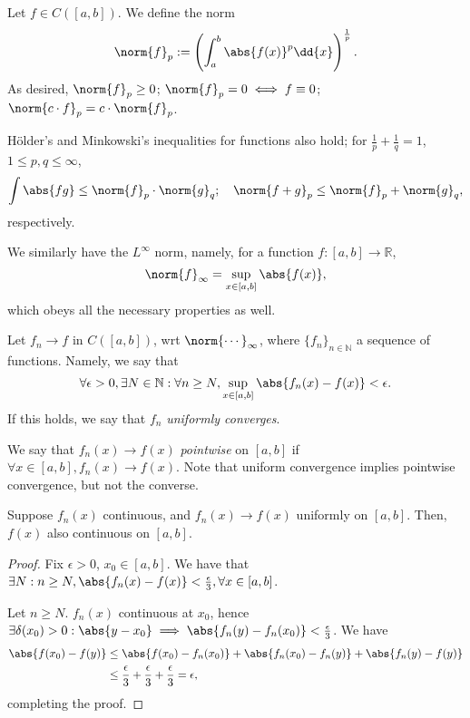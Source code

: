 \begin{example}
    Let $f \in C([a, b])$. We define the norm \[
    \norm{f}_p := \left(\int_a^b \abs{f(x)}^p \dd{x}\right)^\frac{1}{p}.
    \]
    As desired, $\norm{f}_p \geq 0$; $\norm{f}_p = 0 \iff f \equiv 0$; $\norm{c \cdot f}_p  = c \cdot \norm{f}_p$.

    Hölder's and Minkowski's inequalities for functions also hold; for $\frac{1}{p} + \frac{1}{q} = 1$, $1 \leq p, q \leq \infty$, \[
    \int \abs{fg} \leq \norm{f}_p \cdot\norm{g}_q; \quad \norm{f + g}_p \leq \norm{f}_p + \norm{g}_q,   
    \]
    respectively.

    We similarly have the $L^\infty$ norm, namely, for a function $f: [a,b] \to \mathbb{R}$, \[
    \norm{f}_\infty = \sup_{x \in [a,b]}\abs{f(x)},     
    \]
    which obeys all the necessary properties as well.

    Let $f_n \to f$ in $C([a, b])$, wrt $\norm{\cdots}_\infty$, where $\{f_n\}_{n \in \mathbb{N}}$ a sequence of functions. Namely, we say that $$\forall \epsilon > 0, \exists N \in \mathbb{N} : \forall n \geq N, \sup_{x \in [a,b]} \abs{f_n(x) - f(x)} < \epsilon.$$
    If this holds, we say that $f_n$ \emph{uniformly converges}. 

    We say that $f_n(x) \to f(x)$ \emph{pointwise} on $[a,b]$ if $\forall x \in [a, b], f_n (x) \to f(x)$. Note that uniform convergence implies pointwise convergence, but not the converse.
\end{example}

\begin{theorem}
    Suppose $f_n(x)$ continuous, and $f_n(x) \to f(x)$ uniformly on $[a, b]$. Then, $f(x)$ also continuous on $[a, b]$.
\end{theorem}

\begin{proof}
    Fix $\epsilon > 0$, $x_0 \in [a, b]$. We have that $\exists N : n \geq N, \abs{f_n(x) - f(x)} < \frac{\epsilon}{3}, \forall x \in [a, b]$.

    Let $n \geq N$. $f_n(x)$ continuous at $x_0$, hence $\exists \delta(x_0) > 0 : \abs{y - x_0} \implies \abs{f_n(y) - f_n(x_0)} < \frac{\epsilon}{3}$. We have \begin{align*}
        \abs{f(x_0) - f(y)} &\leq \abs{f(x_0) - f_n(x_0)} + \abs{f_n(x_0) - f_n(y)} + \abs{f_n(y) - f(y)}\\
        &\leq \frac{\epsilon}{3} + \frac{\epsilon}{3} + \frac{\epsilon}{3} = \epsilon,
    \end{align*}
    completing the proof.
\end{proof}

